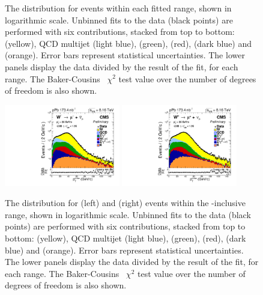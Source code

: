 \begin{figure}[htb!]
\begin{tiny}
\end{tiny}
\caption{The \ptmiss distribution for \WToMuNuPl events within each fitted \etaMuCM range, shown in logarithmic scale. Unbinned fits to the data (black points) are performed with six contributions, stacked from top to bottom: \WToMuNuPl (yellow), QCD multijet (light blue), \DYToMuMu (green), \WToTauNuPl (red), \DYToTauTau (dark blue) and \ttbar (orange). Error bars represent statistical uncertainties. The lower panels display the data divided by the result of the fit, for each \etaMuCM range. The Baker-Cousins~\cite{BakerCousins_Chi2} $\chi^{2}$ test value over the number of degrees of freedom is also shown.}
\label{fig:METFits_WToMuPl_PA}
\end{figure}

\begin{figure}[htb!]
\centering
\begin{tiny}
\includegraphics[width=0.45\textwidth]{Figures/WBoson/Analysis/SignalExtraction/Signal/LOG/PLOT_MET_DATA_WToMuMi_PA_Model_TEMP_WDYDYToTauWToTauTTbar_ModifiedRayleigh_QCD_MuEtaCM_-286_193_MuIso_0_15.pdf}
\includegraphics[width=0.45\textwidth]{Figures/WBoson/Analysis/SignalExtraction/Signal/LOG/PLOT_MET_DATA_WToMuPl_PA_Model_TEMP_WDYDYToTauWToTauTTbar_ModifiedRayleigh_QCD_MuEtaCM_-286_193_MuIso_0_15.pdf}
\end{tiny}
\caption{The \ptmiss distribution for \WToMuNuMi (left) and \WToMuNuPl (right) events within the \etaMuCM-inclusive range, shown in logarithmic scale. Unbinned fits to the data (black points) are performed with six contributions, stacked from top to bottom: \WToMuNu (yellow), QCD multijet (light blue), \DYToMuMu (green), \WToTauNu (red), \DYToTauTau (dark blue) and \ttbar (orange). Error bars represent statistical uncertainties. The lower panels display the data divided by the result of the fit, for each \etaMuCM range. The Baker-Cousins~\cite{BakerCousins_Chi2} $\chi^{2}$ test value over the number of degrees of freedom is also shown.}
\label{fig:METFits_WToMuPl_PA_Inc}
 
\end{figure}